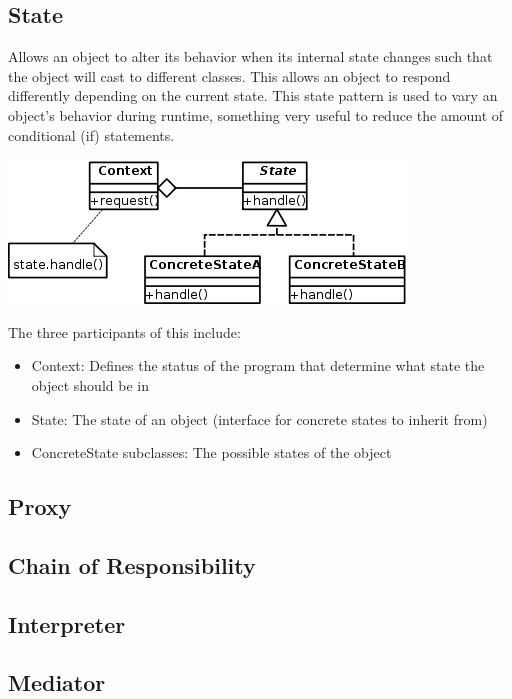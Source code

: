 \documentclass[a4paper, 11pt]{article}
\begin{document}
    \subsection{State}
        Allows an object to alter its behavior when its internal state changes such that the object will cast to different classes.  This allows an object to respond differently depending on the current state.  This state pattern is used to vary an object’s behavior during runtime, something very useful to reduce the amount of conditional (if) statements.
        \begin{center}
            \includegraphics[scale=0.8]{state}
        \end{center}
        The three participants of this include:
        \begin{itemize}
            \item Context: Defines the status of the program that determine what state the object should be in
            \item State: The state of an object (interface for concrete states to inherit from)
            \item ConcreteState subclasses: The possible states of the object
        \end{itemize}

    \subsection{Proxy}

    \subsection{Chain of Responsibility}

    \subsection{Interpreter}

    \subsection{Mediator}
\end{document}
